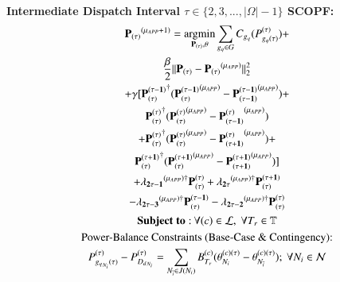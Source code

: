 \documentclass[preprint,12pt,3p]{elsarticle}
\begin{document}
	\textbf{Intermediate Dispatch Interval $\tau \in \{2,3,...,|\Omega|-1\}$ SCOPF:}
	\begin{subequations}\label{Look-Ahead_General_Second_Interval_Angle}
		\begin{gather}
		\mathbf{P_{(\tau)}}^{(\mu_{APP}+1)}=\argmin_{\mathbf{P_{(\tau)}},\theta} \sum_{{g_q}\in G}C_{g_q}(P_{{g_q}(\tau)}^{(\tau)})+\notag\\\frac{\beta}{2}||\mathbf{P_{(\tau)}}-\mathbf{P_{(\tau)}}^{(\mu_{APP})}||_2^2\notag\\+\gamma[\mathbf{P_{(\tau)}^{(\tau-1)}}^{\dagger}(\mathbf{P_{(\tau)}^{(\tau-1)}}^{(\mu_{APP})}-\mathbf{P_{(\tau-1)}^{(\tau-1)}}^{(\mu_{APP})})+\notag\\\mathbf{P_{(\tau)}^{(\tau)}}^{\dagger}(\mathbf{P_{(\tau)}^{(\tau)}}^{(\mu_{APP})}-\mathbf{P_{(\tau-1)}^{(\tau)}}^{(\mu_{APP})})\notag\\+\mathbf{P_{(\tau)}^{(\tau)}}^{\dagger}(\mathbf{P_{(\tau)}^{(\tau)}}^{(\mu_{APP})}-\mathbf{P_{(\tau+1)}^{(\tau)}}^{(\mu_{APP})})+\notag\\\mathbf{P_{(\tau)}^{(\tau+1)}}^{\dagger}(\mathbf{P_{(\tau)}^{(\tau+1)}}^{(\mu_{APP})}-\mathbf{P_{(\tau+1)}^{(\tau+1)}}^{(\mu_{APP})})]\notag\\+ \mathbf{\lambda_{2\tau-1}}^{(\mu_{APP})\dagger}\mathbf{P_{(\tau)}^{(\tau)}}+\mathbf{\lambda_{2\tau}}^{(\mu_{APP})\dagger}\mathbf{P_{(\tau)}^{(\tau+1)}}\notag\\-\mathbf{\lambda_{2\tau-3}}^{(\mu_{APP})\dagger}\mathbf{P_{(\tau)}^{(\tau-1)}}-\mathbf{\lambda_{2\tau-2}}^{(\mu_{APP})\dagger}\mathbf{P_{(\tau)}^{(\tau)}}\label{first_Look-Ahead_General_Second_Interval_Angle}\\
		\mathbf{Subject\;to:}\:\forall(c)\in\mathcal{L},\;\forall T_r\in \mathbb{T}\notag\\
		\text{Power-Balance Constraints (Base-Case \& Contingency):}\notag\\
		P_{{g_q}_{N_i}(\tau)}^{(\tau)}-P_{{D_d}_{N_i}}^{(\tau)}=\sum_{N_{\overline{i}}\in{J(N_i)}}B_{T_r}^{(c)}(\theta_{N_i}^{(c)(\tau)}-\theta_{N_{\overline{i}}}^{(c)(\tau)});\ \forall{{N_i}\in\mathcal{N}}\label{secondA_Look-Ahead_General_Second_Interval_Angle}\\

\end{gather}
\end{subequations}
\end{document}
